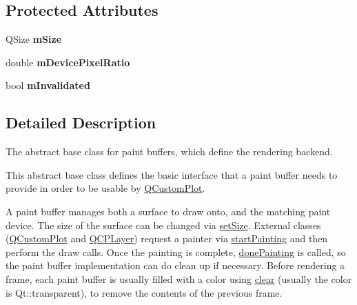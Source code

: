 \subsection*{Protected Attributes}
\begin{DoxyCompactItemize}
\item 
Q\+Size {\bfseries m\+Size}\hypertarget{classQCPAbstractPaintBuffer_ae246c426222bfa18d5e8797fab73e3ce}{}\label{classQCPAbstractPaintBuffer_ae246c426222bfa18d5e8797fab73e3ce}

\item 
double {\bfseries m\+Device\+Pixel\+Ratio}\hypertarget{classQCPAbstractPaintBuffer_a33c1fd784478441fcff9ebf3d69af5b2}{}\label{classQCPAbstractPaintBuffer_a33c1fd784478441fcff9ebf3d69af5b2}

\item 
bool {\bfseries m\+Invalidated}\hypertarget{classQCPAbstractPaintBuffer_a3bc49cc9cf9daaca3a60977f010c08c9}{}\label{classQCPAbstractPaintBuffer_a3bc49cc9cf9daaca3a60977f010c08c9}

\end{DoxyCompactItemize}


\subsection{Detailed Description}
The abstract base class for paint buffers, which define the rendering backend. 

This abstract base class defines the basic interface that a paint buffer needs to provide in order to be usable by \hyperlink{classQCustomPlot}{Q\+Custom\+Plot}.

A paint buffer manages both a surface to draw onto, and the matching paint device. The size of the surface can be changed via \hyperlink{classQCPAbstractPaintBuffer_a8b68c3cd36533f1a4a23b5ce8cd66f01}{set\+Size}. External classes (\hyperlink{classQCustomPlot}{Q\+Custom\+Plot} and \hyperlink{classQCPLayer}{Q\+C\+P\+Layer}) request a painter via \hyperlink{classQCPAbstractPaintBuffer_a9e9f29b19c033cf02fb96f1a148463f3}{start\+Painting} and then perform the draw calls. Once the painting is complete, \hyperlink{classQCPAbstractPaintBuffer_a41b0dc6e7744f19fae09f8532c207dc1}{done\+Painting} is called, so the paint buffer implementation can do clean up if necessary. Before rendering a frame, each paint buffer is usually filled with a color using \hyperlink{classQCPAbstractPaintBuffer_a9e253f4541dfc01992b77e8830bd7722}{clear} (usually the color is {\ttfamily Qt\+::transparent}), to remove the contents of the previous frame.

